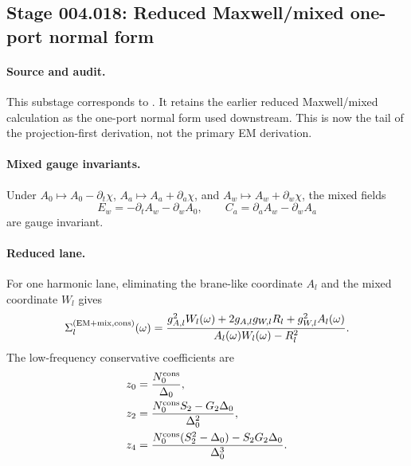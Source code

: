\subsection*{Stage 004.018: Reduced Maxwell/mixed one-port normal form}
\label{subsec:stage004018-reduced-one-port-normal-form}

\paragraph{Source and audit.}
This substage corresponds to
.
It retains the earlier reduced Maxwell/mixed calculation as the one-port
normal form used downstream.  This is now the tail of the projection-first
derivation, not the primary EM derivation.

\paragraph{Mixed gauge invariants.}
Under \(A_0\mapsto A_0-\partial_t\chi\), \(A_a\mapsto A_a+\partial_a\chi\),
and \(A_w\mapsto A_w+\partial_w\chi\), the mixed fields
\begin{equation}
\label{eq:app-stage004-mixed-fields}
E_w=-\partial_tA_w-\partial_wA_0,
\qquad
C_a=\partial_aA_w-\partial_wA_a
\end{equation}
are gauge invariant.

\paragraph{Reduced lane.}
For one harmonic lane, eliminating the brane-like coordinate \(A_l\) and the
mixed coordinate \(W_l\) gives
\begin{equation}
\label{eq:app-stage004-self-energy}
\Sigma_l^{({\rm EM}+{\rm mix},{\rm cons})}(\omega)
=
\frac{g_{A,l}^2W_l(\omega)+2g_{A,l}g_{W,l}R_l+g_{W,l}^2A_l(\omega)}
{A_l(\omega)W_l(\omega)-R_l^2}.
\end{equation}
The low-frequency conservative coefficients are
\begin{align}
\label{eq:app-stage004-z-coeffs}
z_0&=\frac{N_0^{\rm cons}}{\Delta_0},\\
z_2&=\frac{N_0^{\rm cons}S_2-G_2\Delta_0}{\Delta_0^2},\\
z_4&=\frac{N_0^{\rm cons}(S_2^2-\Delta_0)-S_2G_2\Delta_0}{\Delta_0^3}.
\end{align}

